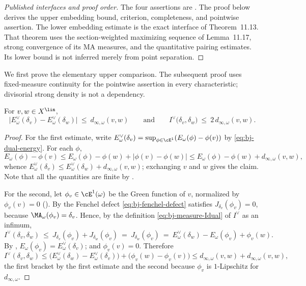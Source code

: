 \begin{proof}[Published interfaces and proof order]
The four assertions are \cite[Theorems~11.4, 11.9, 11.13 and
Corollary~11.15]{BJ22}.  The proof below derives the upper embedding
bound, criterion, completeness, and pointwise assertion.  The lower
embedding estimate is the exact interface of Theorem~11.13.
That theorem uses the section-weighted maximizing sequence of
Lemma~11.17, strong convergence of its MA measures, and the quantitative
pairing estimates.  Its lower bound is not inferred merely from
point separation.
\end{proof}

We first prove the elementary upper comparison.  The subsequent proof
uses fixed-measure continuity for the pointwise assertion in every
characteristic; divisorial strong density is not a dependency.

\begin{proposition}
\label{prop:ch49-embedding-easy}
For $v,w\in X^{\lin}$,
\[
 \bigl|E^\vee_\omega(\delta_v)-E^\vee_\omega(\delta_w)\bigr|
 \ \le\ d_{\infty,\omega}(v,w)
 \qquad\text{and}\qquad
 I^\vee\bigl(\delta_v,\delta_w\bigr)\ \le\ 2\,d_{\infty,\omega}(v,w).
\tag{49.15}\label{eq:ch49-embedding-easy}
\]
\end{proposition}

\begin{proof}
For the first estimate, write
$E^\vee_\omega(\delta_v)=\sup_{\phi\in\cE^1}(E_\omega(\phi)-\phi(v))$ by
\eqref{eq:bj-dual-energy}.  For each $\phi$,
\[
 E_\omega(\phi)-\phi(v)
 \le E_\omega(\phi)-\phi(w)+|\phi(v)-\phi(w)|
 \le E_\omega(\phi)-\phi(w)+d_{\infty,\omega}(v,w),
\]
whence $E^\vee_\omega(\delta_v)\le E^\vee_\omega(\delta_w)
+d_{\infty,\omega}(v,w)$; exchanging $v$ and $w$ gives the claim.
Note that all the quantities are finite by
.

For the second, let $\phi_v\in\cE^1(\omega)$ be the Green function of
$v$, normalized by $\phi_v(v)=0$
().  By
 the Fenchel defect
\eqref{eq:bj-fenchel-defect} satisfies
$J_{\delta_v}(\phi_v)=0$, because $\MA_\omega(\phi_v)=\delta_v$.
Hence, by the definition \eqref{eq:bj-measure-Idual} of $I^\vee$ as an
infimum,
\[
 I^\vee(\delta_v,\delta_w)
 \ \le\ J_{\delta_v}(\phi_v)+J_{\delta_w}(\phi_v)
 \ =\ J_{\delta_w}(\phi_v)
 \ =\ E^\vee_\omega(\delta_w)-E_\omega(\phi_v)+\phi_v(w).
\]
By ,
$E_\omega(\phi_v)=E^\vee_\omega(\delta_v)$; and $\phi_v(v)=0$.
Therefore
\[
 I^\vee(\delta_v,\delta_w)
 \le\bigl(E^\vee_\omega(\delta_w)-E^\vee_\omega(\delta_v)\bigr)
   +\bigl(\phi_v(w)-\phi_v(v)\bigr)
 \le d_{\infty,\omega}(v,w)+d_{\infty,\omega}(v,w),
\]
the first bracket by the first estimate and the second because $\phi_v$
is $1$-Lipschitz for $d_{\infty,\omega}$.
\end{proof}

